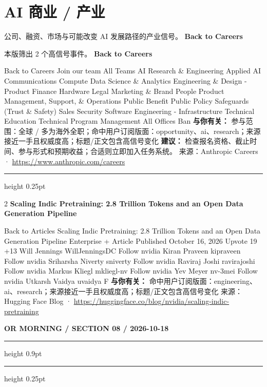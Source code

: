 \documentclass[10.5pt]{ctexart}
\begin{document}
\section*{AI 商业 / 产业}
{\color{ormuted} 公司、融资、市场与可能改变 AI 发展路径的产业信号。}
\vspace{2mm}
{\LARGE\bfseries Back to Careers}\par
\vspace{1mm}
{\color{ormuted} 本版筛出 2 个高信号事件。}
\vspace{3mm}
{\Large\bfseries Back to Careers}\par
Back to Careers Join our team All Teams AI Research \& Engineering Applied AI Communications Compute Data Science \& Analytics Engineering \& Design - Product Finance Hardware Legal Marketing \& Brand People Product Management, Support, \& Operations Public Benefit Public Policy Safeguards (Trust \& Safety) Sales Security Software Engineering - Infrastructure Technical Education Technical Program Management All Offices Ban
\textbf{与你有关：} 参与范围：全球 / 多为海外全职；命中用户订阅版面：opportunity、ai、research；来源接近一手且权威度高；标题/正文包含高信号变化
\textbf{建议：} 检查报名资格、截止时间、参与形式和预期收益；合适则立即加入任务系统。
{\footnotesize\color{ormuted} 来源：Anthropic Careers · \url{https://www.anthropic.com/careers}}
\vspace{4mm}
\hrule height 0.25pt
\vspace{3mm}
\begin{multicols}{2}
{\large\bfseries Scaling Indic Pretraining: 2.8 Trillion Tokens and an Open Data Generation Pipeline}\par
Back to Articles Scaling Indic Pretraining: 2.8 Trillion Tokens and an Open Data Generation Pipeline Enterprise + Article Published October 16, 2026 Upvote 19 +13 Will Jennings WillJenningsDC Follow nvidia Kiran Praveen kipraveen Follow nvidia Sriharsha Niverty sniverty Follow nvidia Raviraj Joshi ravirajoshi Follow nvidia Markus Kliegl mkliegl-nv Follow nvidia Yev Meyer nv-3mei Follow nvidia Utkarsh Vaidya uvaidya F
\textbf{与你有关：} 命中用户订阅版面：engineering、ai、research；来源接近一手且权威度高；标题/正文包含高信号变化
{\footnotesize\color{ormuted} 来源：Hugging Face Blog · \url{https://huggingface.co/blog/nvidia/scaling-indic-pretraining}}
\end{multicols}
\newpage
{\small\bfseries OR MORNING / SECTION 08 / 2026-10-18}
\vspace{2mm}
\hrule height 0.9pt
\vspace{1.5mm}
\hrule height 0.25pt
\vspace{4mm}
\end{document}
